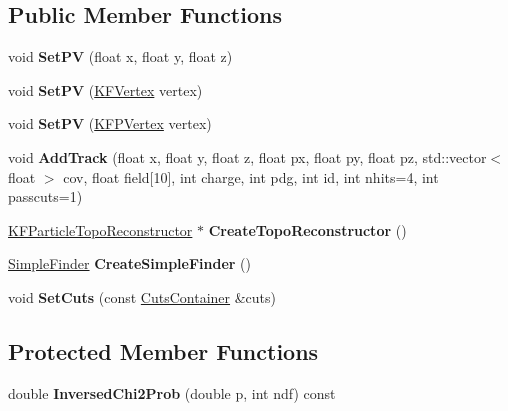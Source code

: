 \subsection*{Public Member Functions}
\begin{DoxyCompactItemize}
\item 
void {\bfseries Set\+PV} (float x, float y, float z)\hypertarget{classInputContainer_ad06aaffdb0b096eb2ed9c6cfa3250d42}{}\label{classInputContainer_ad06aaffdb0b096eb2ed9c6cfa3250d42}

\item 
void {\bfseries Set\+PV} (\hyperlink{classKFVertex}{K\+F\+Vertex} vertex)\hypertarget{classInputContainer_a40505cae1ae3a2217a59b772fa44a6df}{}\label{classInputContainer_a40505cae1ae3a2217a59b772fa44a6df}

\item 
void {\bfseries Set\+PV} (\hyperlink{classKFPVertex}{K\+F\+P\+Vertex} vertex)\hypertarget{classInputContainer_a7de3b46343227047f6dbd70e36e72ccf}{}\label{classInputContainer_a7de3b46343227047f6dbd70e36e72ccf}

\item 
void {\bfseries Add\+Track} (float x, float y, float z, float px, float py, float pz, std\+::vector$<$ float $>$ cov, float field\mbox{[}10\mbox{]}, int charge, int pdg, int id, int nhits=4, int passcuts=1)\hypertarget{classInputContainer_a53342c390b742ea13123c792007b8ca3}{}\label{classInputContainer_a53342c390b742ea13123c792007b8ca3}

\item 
\hyperlink{classKFParticleTopoReconstructor}{K\+F\+Particle\+Topo\+Reconstructor} $\ast$ {\bfseries Create\+Topo\+Reconstructor} ()\hypertarget{classInputContainer_aedadbb7d4f78e927027aa4acb7793f8f}{}\label{classInputContainer_aedadbb7d4f78e927027aa4acb7793f8f}

\item 
\hyperlink{classSimpleFinder}{Simple\+Finder} {\bfseries Create\+Simple\+Finder} ()\hypertarget{classInputContainer_a3aa4cca1fc8ec2cf0b124c78e01b6658}{}\label{classInputContainer_a3aa4cca1fc8ec2cf0b124c78e01b6658}

\item 
void {\bfseries Set\+Cuts} (const \hyperlink{classCutsContainer}{Cuts\+Container} \&cuts)\hypertarget{classInputContainer_a1f085ead392f5b6e79236514dfdba9b5}{}\label{classInputContainer_a1f085ead392f5b6e79236514dfdba9b5}

\end{DoxyCompactItemize}
\subsection*{Protected Member Functions}
\begin{DoxyCompactItemize}
\item 
double {\bfseries Inversed\+Chi2\+Prob} (double p, int ndf) const \hypertarget{classInputContainer_a73bcf36b0263f16c334b97661fae0eea}{}\label{classInputContainer_a73bcf36b0263f16c334b97661fae0eea}

\end{DoxyCompactItemize}
